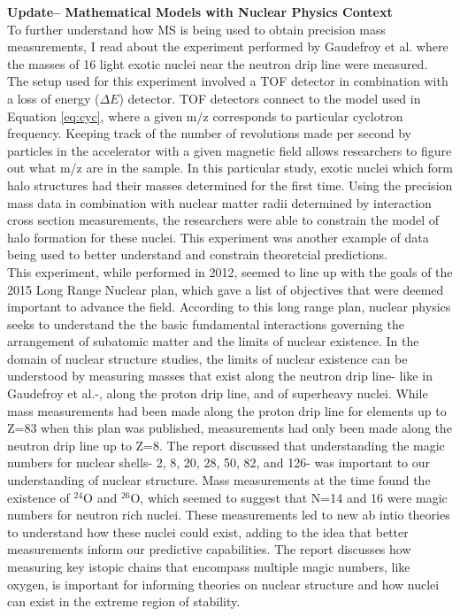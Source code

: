 \documentclass[12pt]{amsart}
\begin{document}
\noindent\textbf{Update-- Mathematical Models with Nuclear Physics Context}\\

To further understand how MS is being used to obtain precision mass measurements, I read about the experiment performed by Gaudefroy et al. where the masses of 16 light exotic nuclei near the neutron drip line were measured. The setup used for this experiment involved a TOF detector in combination with a loss of energy ($\Delta E$) detector. TOF detectors connect to the model used in Equation \eqref{eq:cyc}, where a given m/z corresponds to particular cyclotron frequency. Keeping track of the number of revolutions made per second by particles in the accelerator with a given magnetic field allows researchers to figure out what m/z are in the sample. In this particular study, exotic nuclei which form halo structures had their masses determined for the first time. Using the precision mass data in combination with nuclear matter radii determined by interaction cross section measurements, the researchers were able to constrain the model of halo formation for these nuclei. This experiment was another example of data being used to better understand and constrain theoretcial predictions. \cite{exotic}\\

This experiment, while performed in 2012, seemed to line up with the goals of the 2015 Long Range Nuclear plan, which gave a list of objectives that were deemed important to advance the field. According to this long range plan, nuclear physics seeks to understand the the basic fundamental interactions governing the arrangement of subatomic matter and the limits of nuclear existence. In the domain of nuclear structure studies, the limits of nuclear existence can be understood by measuring masses that exist along the neutron drip line- like in Gaudefroy et al.-, along the proton drip line, and of superheavy nuclei. While mass measurements had been made along the proton drip line for elements up to Z=83 when this plan was published, measurements had only been made along the neutron drip line up to Z=8. The report discussed that understanding the magic numbers for nuclear shells- 2, 8, 20, 28, 50, 82, and 126- was important to our understanding of nuclear structure. Mass measurements at the time found the existence of $^{24}$O and $^{26}$O, which seemed to suggest that N=14 and 16 were magic numbers for neutron rich nuclei. These measurements led to new ab intio theories to understand how these nuclei could exist, adding to the idea that better measurements inform our predictive capabilities. The report discusses how measuring key istopic chains that encompass multiple magic numbers, like oxygen, is important for informing theories on nuclear structure and how nuclei can exist in the extreme region of stability. \cite{lrp}\\
\end{document}
